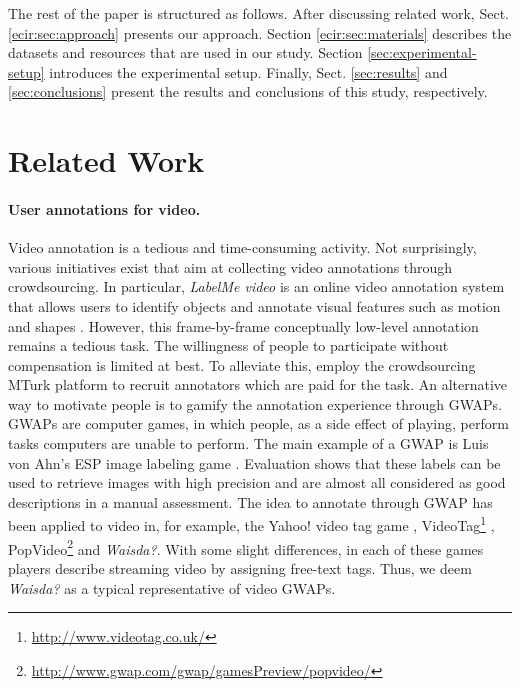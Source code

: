 The rest of the paper is structured as follows.  After discussing related work, Sect. \ref{ecir:sec:approach} presents our approach. 
Section \ref{ecir:sec:materials} describes the datasets and resources that are used in our study. 
Section \ref{sec:experimental-setup} introduces the experimental setup. Finally, Sect. \ref{sec:results} and \ref{sec:conclusions} present the results and conclusions of this study, respectively.

\section{Related Work}\label{sec:related-work}
\paragraph{User annotations for video.}Video annotation is a tedious and time-consuming activity. Not surprisingly, various initiatives exist that aim at collecting video annotations through crowdsourcing. In particular, \textit{LabelMe video} is an online video annotation system that allows users to identify objects and annotate visual features such as motion and shapes \cite{labelme}. However, this frame-by-frame conceptually low-level annotation remains a tedious task. The willingness of people to participate without compensation is limited at best. To alleviate this, \cite{turk1,turk2} employ the crowdsourcing MTurk platform to recruit annotators which are paid for the task. An alternative way to motivate people is to gamify the annotation experience through GWAPs. GWAPs are computer games, in which people, as a side effect of playing, perform tasks computers are unable to perform. The main example of a GWAP is Luis von Ahn's ESP image labeling game \cite{CHI2004:vonAhn}. Evaluation shows that these labels can be used to retrieve images with high precision and are almost all considered as good descriptions in a manual assessment. The idea to annotate through GWAP has been applied to video in, for example, the Yahoo! video tag game \cite{WWW08_vanZwol_etal}, VideoTag\footnote{\url{http://www.videotag.co.uk/}} , PopVideo\footnote{\url{http://www.gwap.com/gwap/gamesPreview/popvideo/}} and \textit{Waisda?}. With some slight differences, in each of these games players describe streaming video by assigning free-text tags. Thus, we deem \textit{Waisda?} as a typical representative of video GWAPs. 
